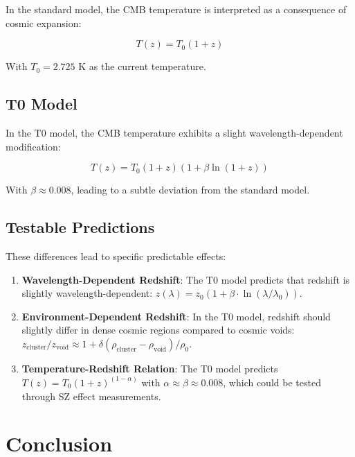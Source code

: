 \documentclass[a4paper,12pt]{article}
\theoremstyle{definition}
\theoremstyle{remark}
\begin{document}
	In the standard model, the CMB temperature is interpreted as a consequence of cosmic expansion:
	
	\begin{equation}
		T(z) = T_0 (1 + z)
	\end{equation}
	
	With $T_0 = 2.725$ K as the current temperature.
	
	\subsection{T0 Model}
	
	In the T0 model, the CMB temperature exhibits a slight wavelength-dependent modification:
	
	\begin{equation}
		T(z) = T_0 (1 + z)(1 + \beta \ln(1 + z))
	\end{equation}
	
	With $\beta \approx 0.008$, leading to a subtle deviation from the standard model.
	
	\subsection{Testable Predictions}
	
	These differences lead to specific predictable effects:
	
	\begin{enumerate}
		\item \textbf{Wavelength-Dependent Redshift}: The T0 model predicts that redshift is slightly wavelength-dependent: $z(\lambda) = z_0(1 + \beta\cdot\ln(\lambda/\lambda_0))$.
		
		\item \textbf{Environment-Dependent Redshift}: In the T0 model, redshift should slightly differ in dense cosmic regions compared to cosmic voids: $z_\text{cluster}/z_\text{void} \approx 1 + \delta(\rho_\text{cluster}-\rho_\text{void})/\rho_0$.
		
		\item \textbf{Temperature-Redshift Relation}: The T0 model predicts $T(z) = T_0(1+z)^{(1-\alpha)}$ with $\alpha \approx \beta \approx 0.008$, which could be tested through SZ effect measurements.
	\end{enumerate}
	
	\section{Conclusion}
	
\end{document}
